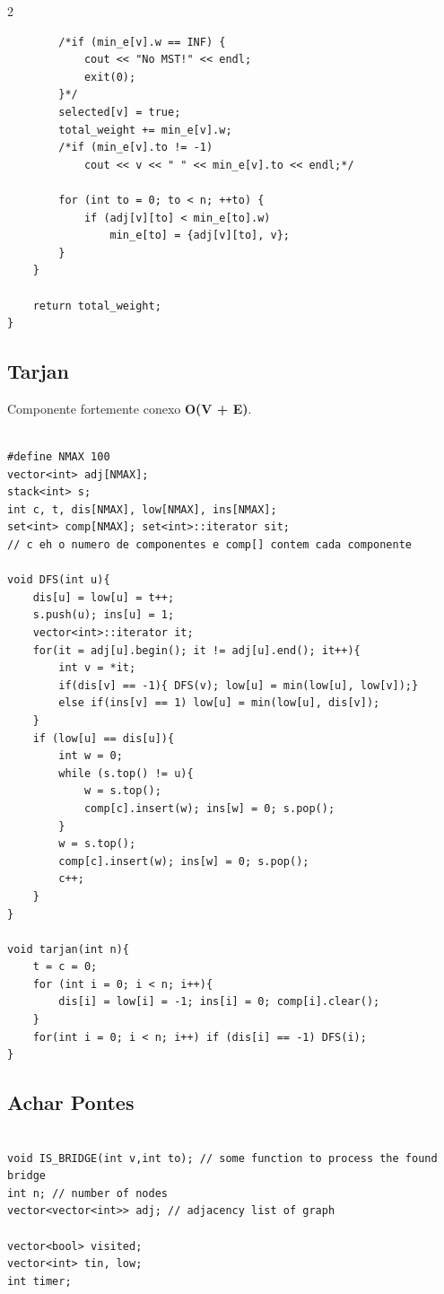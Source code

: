\documentclass[11pt]{article}
\begin{document}
\begin{multicols}{2}
\begin{lstlisting}
        /*if (min_e[v].w == INF) {
            cout << "No MST!" << endl;
            exit(0);
        }*/
        selected[v] = true;
        total_weight += min_e[v].w;
        /*if (min_e[v].to != -1)
            cout << v << " " << min_e[v].to << endl;*/

        for (int to = 0; to < n; ++to) {
            if (adj[v][to] < min_e[to].w)
                min_e[to] = {adj[v][to], v};
        }
    }

    return total_weight;
}
\end{lstlisting}

\subsection{Tarjan}
Componente fortemente conexo \textbf{O(V + E)}.
\begin{lstlisting}

#define NMAX 100
vector<int> adj[NMAX];
stack<int> s;
int c, t, dis[NMAX], low[NMAX], ins[NMAX];
set<int> comp[NMAX]; set<int>::iterator sit;
// c eh o numero de componentes e comp[] contem cada componente

void DFS(int u){
    dis[u] = low[u] = t++;
    s.push(u); ins[u] = 1;
    vector<int>::iterator it;
    for(it = adj[u].begin(); it != adj[u].end(); it++){
        int v = *it;
        if(dis[v] == -1){ DFS(v); low[u] = min(low[u], low[v]);}
        else if(ins[v] == 1) low[u] = min(low[u], dis[v]);
    }
    if (low[u] == dis[u]){
        int w = 0;
        while (s.top() != u){
            w = s.top();
            comp[c].insert(w); ins[w] = 0; s.pop();
        }
        w = s.top();
        comp[c].insert(w); ins[w] = 0; s.pop();
        c++;
    } 
}

void tarjan(int n){
    t = c = 0;
    for (int i = 0; i < n; i++){
        dis[i] = low[i] = -1; ins[i] = 0; comp[i].clear();
    }
    for(int i = 0; i < n; i++) if (dis[i] == -1) DFS(i);
}
\end{lstlisting}

\subsection{Achar Pontes}
\begin{lstlisting}

void IS_BRIDGE(int v,int to); // some function to process the found bridge
int n; // number of nodes
vector<vector<int>> adj; // adjacency list of graph

vector<bool> visited;
vector<int> tin, low;
int timer;


\end{lstlisting}
\end{multicols}
\end{document}
